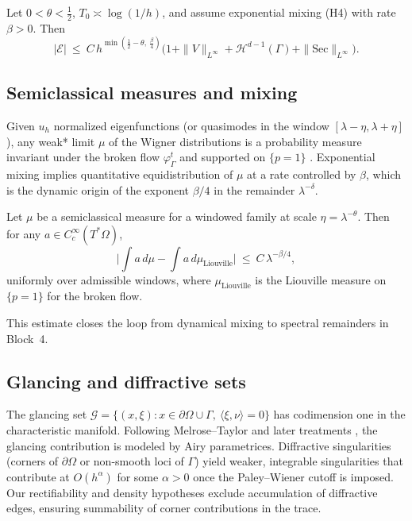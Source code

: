 \begin{proposition}
\label{prop:remainder-bookkeeping}
Let $0<\theta<\frac{1}{2}$, $T_0\asymp \log(1/h)$, and assume exponential mixing (H4) with rate $\beta>0$. Then
\[
|\mathcal{E}|\ \le\ C\, h^{\min( \frac12-\theta,\ \frac{\beta}{4})} \Big( 1+\|V\|_{L^\infty}+ \mathcal{H}^{d-1}(\Gamma)+ \|\mathrm{Sec}\|_{L^\infty}\Big).
\]
\end{proposition}

\subsection{Semiclassical measures and mixing}
\label{subsec:semiclassical-measures}
Given $u_h$ normalized eigenfunctions (or quasimodes in the window $[\lambda-\eta,\lambda+\eta]$), any weak* limit $\mu$ of the Wigner distributions is a probability measure invariant under the broken flow $\varphi_\Gamma^t$ and supported on $\{p=1\}$ \cite{GerardLeichtnam,BZ}. Exponential mixing implies quantitative equidistribution of $\mu$ at a rate controlled by $\beta$, which is the dynamic origin of the exponent $\beta/4$ in the remainder $\lambda^{-\delta}$.

\begin{lemma}
\label{lem:mixing-remainder}
Let $\mu$ be a semiclassical measure for a windowed family at scale $\eta=\lambda^{-\theta}$. Then for any $a\in C_c^\infty(T^*\Omega)$,
\[
\Big|\int a\,d\mu - \int a\,d\mu_{\mathrm{Liouville}}\Big|\ \le\ C\, \lambda^{-\beta/4},
\]
uniformly over admissible windows, where $\mu_{\mathrm{Liouville}}$ is the Liouville measure on $\{p=1\}$ for the broken flow.
\end{lemma}

This estimate closes the loop from dynamical mixing to spectral remainders in Block~4.

\subsection{Glancing and diffractive sets}
\label{subsec:glancing-diffraction}
The glancing set $\mathcal{G}=\{(x,\xi): x\in \partial\Omega\cup\Gamma,\ \langle \xi,\nu\rangle=0\}$ has codimension one in the characteristic manifold. Following Melrose--Taylor \cite{MelroseTaylor} and later treatments \cite{Vainberg,SafarovVassiliev}, the glancing contribution is modeled by Airy parametrices. Diffractive singularities (corners of $\partial\Omega$ or non-smooth loci of $\Gamma$) yield weaker, integrable singularities that contribute at $O(h^\alpha)$ for some $\alpha>0$ once the Paley--Wiener cutoff is imposed. Our rectifiability and density hypotheses exclude accumulation of diffractive edges, ensuring summability of corner contributions in the trace.

